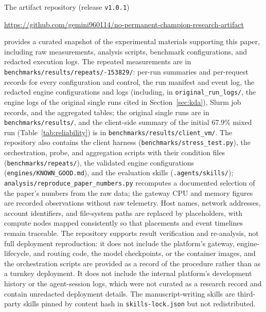 \documentclass[11pt]{article}
\begin{document}
The artifact repository (release \texttt{v1.0.1})
\begin{center}\url{https://github.com/gemini960114/no-permanent-champion-research-artifact}\end{center}
\noindent provides a curated snapshot of the experimental materials supporting this paper, including raw measurements, analysis scripts, benchmark configurations, and redacted execution logs. The repeated measurements are in \texttt{benchmarks/\allowbreak results/\allowbreak repeats/-153829/}: per-run summaries and per-request records for every configuration and control, the run manifest and event log, the redacted engine configurations and logs (including, in \texttt{original\_run\_logs/}, the engine logs of the original single runs cited in Section~\ref{sec:kda}), Slurm job records, and the aggregated tables; the original single runs are in \texttt{benchmarks/\allowbreak results/}, and the client-side summary of the initial 67.9\% mixed run (Table~\ref{tab:reliability}) is in \texttt{benchmarks/\allowbreak results/\allowbreak client\_vm/}. The repository also contains the client harness (\texttt{benchmarks/\allowbreak stress\_test.py}), the orchestration, probe, and aggregation scripts with their condition files (\texttt{benchmarks/\allowbreak repeats/}), the validated engine configurations (\texttt{engines/KNOWN\_GOOD.md}), and the evaluation skills (\texttt{.agents/skills/}); \texttt{analysis/\allowbreak reproduce\_paper\_numbers.py} recomputes a documented selection of the paper's numbers from the raw data; the gateway CPU and memory figures are recorded observations without raw telemetry. Host names, network addresses, account identifiers, and file-system paths are replaced by placeholders, with compute nodes mapped consistently so that placements and event timelines remain traceable. The repository supports result verification and re-analysis, not full deployment reproduction: it does not include the platform's gateway, engine-lifecycle, and routing code, the model checkpoints, or the container images, and the orchestration scripts are provided as a record of the procedure rather than as a turnkey deployment. It does not include the internal platform's development history or the agent-session logs, which were not curated as a research record and contain unredacted deployment details. The manuscript-writing skills are third-party skills pinned by content hash in \texttt{skills-lock.json} but not redistributed.



\end{document}
